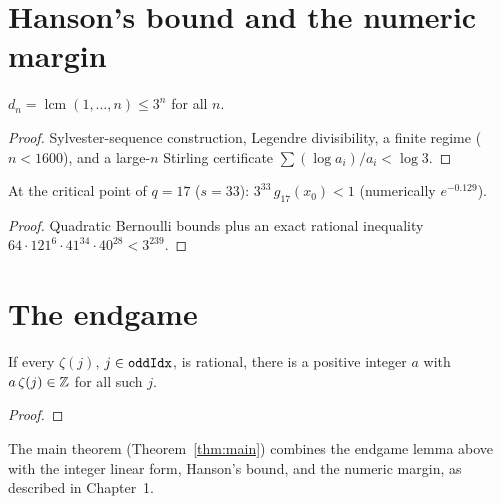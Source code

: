 \chapter{Hanson's bound and the numeric margin}

\begin{theorem}
  \label{thm:hanson}
  \leanok
  $d_n=\operatorname{lcm}(1,\dots,n)\le 3^n$ for all $n$.
\end{theorem}
\begin{proof}\leanok
  Sylvester-sequence construction, Legendre divisibility, a finite
   regime ($n<1600$), and a large-$n$ Stirling certificate
  $\sum(\log a_i)/a_i<\log 3$.
\end{proof}

\begin{lemma}
  \label{lem:gsmall}
  \leanok
  At the critical point of $q=17$ ($s=33$): $3^{33}\,g_{17}(x_0)<1$
  (numerically $e^{-0.129}$).
\end{lemma}
\begin{proof}\leanok{}
  Quadratic Bernoulli bounds plus an exact rational inequality
  $64\cdot121^{6}\cdot41^{34}\cdot40^{28}<3^{239}$.
\end{proof}

\chapter{The endgame}

\begin{lemma}
  \label{lem:common_denom}
  \leanok
  If every $\zeta(j)$, $j\in\texttt{oddIdx}$, is rational, there is a positive
  integer $a$ with $a\,\zeta(j)\in\mathbb{Z}$ for all such $j$.
\end{lemma}
\begin{proof}\leanok\end{proof}

The main theorem (Theorem~\ref{thm:main}) combines the endgame lemma above with
the integer linear form, Hanson's bound, and the numeric margin, as described in
Chapter~1.
